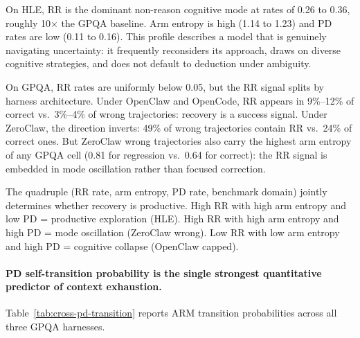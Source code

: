 On HLE, RR is the dominant non-reason cognitive mode at rates of 0.26 to
0.36, roughly 10$\times$ the GPQA baseline.
Arm entropy is high (1.14 to 1.23) and PD rates are low (0.11 to 0.16).
This profile describes a model that is genuinely navigating uncertainty: it
frequently reconsiders its approach, draws on diverse cognitive strategies,
and does not default to deduction under ambiguity.

On GPQA, RR rates are uniformly below 0.05, but the RR signal splits by
harness architecture.
Under OpenClaw and OpenCode, RR appears in 9\%--12\% of correct vs.\
3\%--4\% of wrong trajectories: recovery is a success signal.
Under ZeroClaw, the direction inverts: 49\% of wrong trajectories contain RR
vs.\ 24\% of correct ones.
But ZeroClaw wrong trajectories also carry the highest arm entropy of any
GPQA cell (0.81 for regression vs.\ 0.64 for correct): the RR signal is
embedded in mode oscillation rather than focused correction.

The quadruple (RR rate, arm entropy, PD rate, benchmark domain) jointly
determines whether recovery is productive.
High RR with high arm entropy and low PD = productive exploration (HLE).
High RR with high arm entropy and high PD = mode oscillation (ZeroClaw wrong).
Low RR with low arm entropy and high PD = cognitive collapse (OpenClaw capped).

\paragraph{PD self-transition probability is the single strongest
quantitative predictor of context exhaustion.}

Table~\ref{tab:cross-pd-transition} reports ARM transition probabilities
across all three GPQA harnesses.

